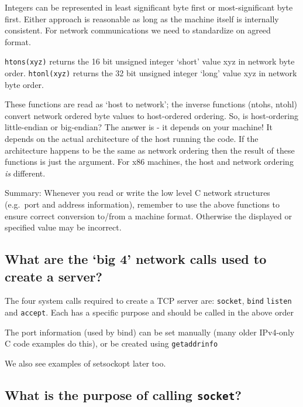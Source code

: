 Integers can be represented in least significant byte first or
most-significant byte first. Either approach is reasonable as long as
the machine itself is internally consistent. For network communications
we need to standardize on agreed format.

\texttt{htons(xyz)} returns the 16 bit unsigned integer `short' value
xyz in network byte order. \texttt{htonl(xyz)} returns the 32 bit
unsigned integer `long' value xyz in network byte order.

These functions are read as `host to network'; the inverse functions
(ntohs, ntohl) convert network ordered byte values to host-ordered
ordering. So, is host-ordering little-endian or big-endian? The answer
is - it depends on your machine! It depends on the actual architecture
of the host running the code. If the architecture happens to be the same
as network ordering then the result of these functions is just the
argument. For x86 machines, the host and network ordering \emph{is}
different.

Summary: Whenever you read or write the low level C network structures
(e.g.~port and address information), remember to use the above functions
to ensure correct conversion to/from a machine format. Otherwise the
displayed or specified value may be incorrect.

\subsection{\texorpdfstring{What are the `big 4' network calls used to
create a
server?}{What are the big 4 network calls used to create a server?}}\label{what-are-the-big-4-network-calls-used-to-create-a-server}

The four system calls required to create a TCP server are:
\texttt{socket}, \texttt{bind} \texttt{listen} and \texttt{accept}. Each
has a specific purpose and should be called in the above order

The port information (used by bind) can be set manually (many older
IPv4-only C code examples do this), or be created using
\texttt{getaddrinfo}

We also see examples of setsockopt later too.

\subsection{\texorpdfstring{What is the purpose of calling
\texttt{socket}?}{What is the purpose of calling socket?}}\label{what-is-the-purpose-of-calling-socket}

